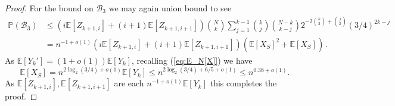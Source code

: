 \documentclass[11pt]{article}
\theoremstyle{definition}
\theoremstyle{remark}
\newcommand{\E}{\mathbb{E}}
\newcommand{\PP}{\mathbb{P}}
\newcommand{\cB}{\mathcal{B}}
\begin{document}
\begin{proof}
    For the bound on $\cB_3$ we may again union bound to see \begin{align*}
        \PP(\cB_3) &\leq (i \E[Z_{k+1,i}] + (i+1) \E[ Z_{k+1, i+1}]) \binom{N}{k} \sum_{j = 1}^{k-1} \binom{k}{j} \binom{N - k}{k - j}2^{-2\binom{k}{2} + \binom{j}{2}} (3/4)^{2k-j} \\
        &= n^{-1 + o(1)}( i\E[Z_{k+1,i}] + (i+1) \E[ Z_{k+1, i+1}]) \left(\E[X_S]^2 + \E[X_S]\right)\,. 
    \end{align*}
    As $ \E[ Y_k'] = (1+o(1)) \E[Y_k]$, recalling (\ref{eq:E_N[X]}) we have
    $$\E[X_S] = n^{2\log_2(3/4) + o(1)} \E[Y_k] \le n^{2\log_2(3/4) + 6/5+o(1)}
    \le n^{0.38 +o(1)}.
    $$ As $\E[Z_{k+1,i}], \E[Z_{k+1,i+1}]$ are each $n^{-1 + o(1)} \E[Y_k]$ this completes the proof.
\end{proof}
\end{document}
